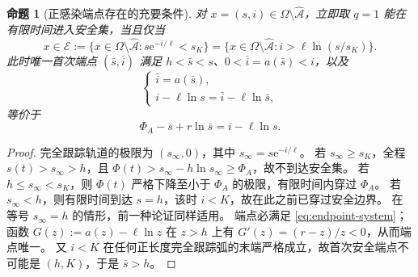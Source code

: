 \documentclass[11pt,a4paper,UTF8]{ctexart}
\newtheorem{proposition}[theorem]{命题}
\theoremstyle{definition}
\newcommand{\Acal}{\mathcal A}
\newcommand{\e}{\mathrm e}
\begin{document}
\begin{proposition}[正感染端点存在的充要条件]
\label{prop:reachable}
对 $x=(s,i)\in\Omega\setminus\widehat{\Acal}$，立即取 $q=1$ 能在有限时间进入安全集，当且仅当
\begin{equation}
x\in\mathcal E:=\{x\in\Omega\setminus\widehat{\Acal}:s\e^{-i/\ell}<s_K\}
=\{x\in\Omega\setminus\widehat{\Acal}:i>\ell\ln(s/s_K)\}.
\label{eq:reachable}
\end{equation}
此时唯一首次端点 $(\bar s,\bar i)$ 满足 $h<\bar s<s$、$0<\bar i=a(\bar s)<i$，以及
\begin{equation}
\begin{cases}
\bar i=a(\bar s),\\ i-\ell\ln s=\bar i-\ell\ln\bar s,
\end{cases}
\label{eq:endpoint-system}
\end{equation}
等价于
\begin{equation}
\Phi_A-\bar s+r\ln\bar s=i-\ell\ln s.
\label{eq:endpoint-root}
\end{equation}
\end{proposition}
\begin{proof}
完全跟踪轨道的极限为 $(s_\infty,0)$，其中 $s_\infty=s\e^{-i/\ell}$。
若 $s_\infty\ge s_K$，全程 $s(t)>s_\infty>h$，且
$\Phi(t)>s_\infty-h\ln s_\infty\ge\Phi_A$，故不到达安全集。
若 $h\le s_\infty<s_K$，则 $\Phi(t)$ 严格下降至小于 $\Phi_A$ 的极限，有限时间内穿过 $\Phi_A$。
若 $s_\infty<h$，则有限时间到达 $s=h$，该时 $i<K$，故在此之前已穿过安全边界。
在等号 $s_\infty=h$ 的情形，前一种论证同样适用。
端点必满足 \eqref{eq:endpoint-system}；函数 $G(z):=a(z)-\ell\ln z$ 在 $z>h$ 上有
$G'(z)=(r-z)/z<0$，从而端点唯一。
又 $i<K$ 在任何正长度完全跟踪弧的末端严格成立，故首次安全端点不可能是 $(h,K)$，于是 $\bar s>h$。
\end{proof}
\end{document}
